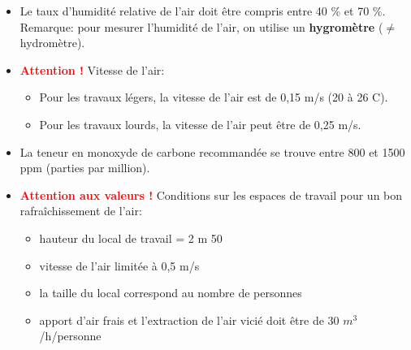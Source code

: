 \documentclass[a4paper]{article}
\begin{document}
\begin{itemize}
\item Le taux d’humidité relative de l’air doit être compris entre 40 \% et 70 \%. \\
Remarque: pour mesurer l'humidité de l'air, on utilise un \textbf{hygromètre} ($ \neq $ hydromètre).





\item \textcolor{red}{\textbf{Attention !}} Vitesse de l'air:
\begin{itemize}
    \item Pour les travaux légers, la vitesse de l’air est de 0,15 m/s (20 à 26 \textdegree C).
    \item Pour les travaux lourds, la vitesse de l’air peut être de 0,25 m/s.
\end{itemize}





\item La teneur en monoxyde de carbone recommandée se trouve entre 800 et 1500 ppm (parties par million).





\item \textcolor{red}{\textbf{Attention aux valeurs !}} Conditions sur les espaces de travail pour un bon rafraîchissement de l'air:
\begin{itemize}
    \item hauteur du local de travail = 2 m 50
    \item vitesse de l'air limitée à 0,5 m/s
    \item la taille du local correspond au nombre de personnes
    \item apport d’air frais et l’extraction de l’air vicié doit être de 30 $m^3$/h/personne
\end{itemize}











\end{itemize}
\end{document}
